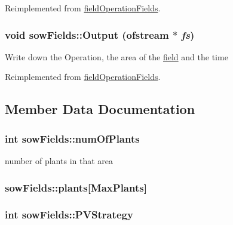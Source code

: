 Reimplemented from \hyperlink{classfield_operation_fields_aef84e67b95aeff732e28cbd2b197648a}{fieldOperationFields}.\hypertarget{classsow_fields_ad522bac768458cd78dfd8766545556bb}{
\subsubsection[{Output}]{\setlength{\rightskip}{0pt plus 5cm}void sowFields::Output (ofstream $\ast$ {\em fs})}}
\label{classsow_fields_ad522bac768458cd78dfd8766545556bb}
Write down the Operation, the area of the \hyperlink{classfield}{field} and the time 

Reimplemented from \hyperlink{classfield_operation_fields_a8dff595b832bca540dda946639f7f47a}{fieldOperationFields}.

\subsection{Member Data Documentation}
\hypertarget{classsow_fields_a8db7db6666e24673192929e5ded6f997}{
\subsubsection[{numOfPlants}]{\setlength{\rightskip}{0pt plus 5cm}int {\bf sowFields::numOfPlants}}}
\label{classsow_fields_a8db7db6666e24673192929e5ded6f997}


number of plants in that area \hypertarget{classsow_fields_ae686b511409010a29219373a85126e36}{
\subsubsection[{plants}]{ {\bf sowFields::plants}\mbox{[}MaxPlants\mbox{]}}}
\label{classsow_fields_ae686b511409010a29219373a85126e36}
\hypertarget{classsow_fields_ab43b87025b3e78f3624616754dd98120}{
\subsubsection[{PVStrategy}]{\setlength{\rightskip}{0pt plus 5cm}int {\bf sowFields::PVStrategy}}}
\label{classsow_fields_ab43b87025b3e78f3624616754dd98120}


